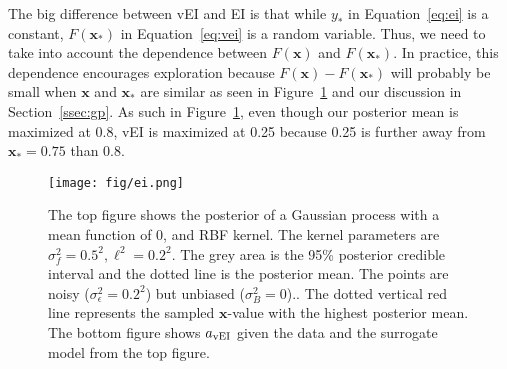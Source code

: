 The big difference between vEI and EI is that while $y_*$ in Equation~\ref{eq:ei} is a constant, $F(\mathbf{x}_*)$ in Equation~\ref{eq:vei} is a random variable.
Thus, we need to take into account the dependence between $F(\mathbf{x})$ and $F(\mathbf{x}_*)$.
In practice,
this dependence encourages exploration
because $F(\mathbf{x}) - F(\mathbf{x}_*)$ will probably be small when
$\mathbf{x}$ and $\mathbf{x}_*$ are similar as seen in Figure~\ref{fig:ei} and our discussion in Section~\ref{ssec:gp}.
As such in Figure~\ref{fig:ei}, even though our posterior mean is maximized at 0.8, vEI is maximized at 0.25 because 0.25 is further away from $\mathbf{x}_* = 0.75$ than 0.8.

\begin{figure}[t]
    \centering
    \texttt{[image: fig/ei.png]}
    \caption{
        The top figure shows the posterior of a Gaussian process with a mean function of 0,
        and RBF kernel.
        The kernel parameters are $\sigma_f^2 = 0.5^2, \ell^2 = 0.2^2$.
        The grey area is the 95\% posterior credible interval and the dotted line is the posterior mean.
        The points are noisy ($\sigma_{\epsilon}^2 = 0.2^2$)
        but unbiased ($\sigma_B^{2} = 0$)..
        The dotted vertical red line represents the sampled $\mathbf{x}$-value with the highest posterior mean.
        The bottom figure shows $a_{\mathrm{vEI}}$ given the data and the surrogate model from the top figure.
    }
    \label{fig:ei}

\end{figure}

